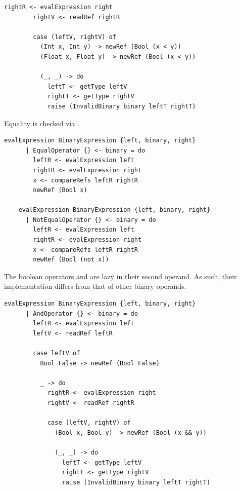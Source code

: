 \documentclass[UdineBachThesis,american,11pt]{PhdThesis}
\begin{document}
  \newpage

  \begin{lstlisting}[gobble=4,basicstyle=\ttfamily\small]
        rightR <- evalExpression right
        rightV <- readRef rightR

        case (leftV, rightV) of
          (Int x, Int y) -> newRef (Bool (x < y))
          (Float x, Float y) -> newRef (Bool (x < y))

          (_, _) -> do
            leftT <- getType leftV
            rightT <- getType rightV
            raise (InvalidBinary binary leftT rightT)
  \end{lstlisting}

  Equality is checked via \lstinline@compareRefs@.

  \begin{lstlisting}[gobble=4,basicstyle=\ttfamily\small]
    evalExpression BinaryExpression {left, binary, right}
      | EqualOperator {} <- binary = do
        leftR <- evalExpression left
        rightR <- evalExpression right
        x <- compareRefs leftR rightR
        newRef (Bool x)

    evalExpression BinaryExpression {left, binary, right}
      | NotEqualOperator {} <- binary = do
        leftR <- evalExpression left
        rightR <- evalExpression right
        x <- compareRefs leftR rightR
        newRef (Bool (not x))
  \end{lstlisting}

  The boolean operators \lstinline@and@ and \lstinline@or@ are lazy in their
  second operand. As such, their implementation differs from that of other
  binary operands.

  \begin{lstlisting}[gobble=4,basicstyle=\ttfamily\small]
    evalExpression BinaryExpression {left, binary, right}
      | AndOperator {} <- binary = do
        leftR <- evalExpression left
        leftV <- readRef leftR

        case leftV of
          Bool False -> newRef (Bool False)

          _ -> do
            rightR <- evalExpression right
            rightV <- readRef rightR

            case (leftV, rightV) of
              (Bool x, Bool y) -> newRef (Bool (x && y))

              (_, _) -> do
                leftT <- getType leftV
                rightT <- getType rightV
                raise (InvalidBinary binary leftT rightT)
  \end{lstlisting}
\end{document}
